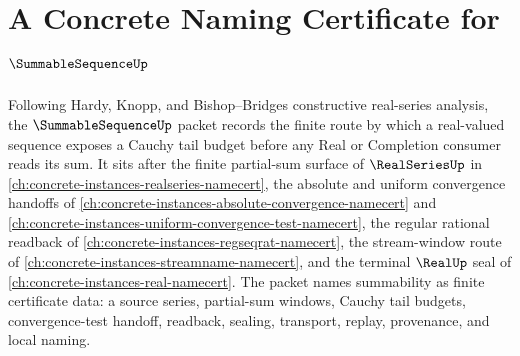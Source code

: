 \chapter{A Concrete Naming Certificate for $\SummableSequenceUp$}
\label{ch:concrete-instances-summable-sequence-namecert}

Following Hardy, Knopp, and Bishop--Bridges constructive real-series analysis, the $\SummableSequenceUp$ packet records the finite route by which a real-valued sequence exposes a Cauchy tail budget before any Real or Completion consumer reads its sum. It sits after the finite partial-sum surface of $\RealSeriesUp$ in \autoref{ch:concrete-instances-realseries-namecert}, the absolute and uniform convergence handoffs of \autoref{ch:concrete-instances-absolute-convergence-namecert} and \autoref{ch:concrete-instances-uniform-convergence-test-namecert}, the regular rational readback of \autoref{ch:concrete-instances-regseqrat-namecert}, the stream-window route of \autoref{ch:concrete-instances-streamname-namecert}, and the terminal $\RealUp$ seal of \autoref{ch:concrete-instances-real-namecert}. The packet names summability as finite certificate data: a source series, partial-sum windows, Cauchy tail budgets, convergence-test handoff, readback, sealing, transport, replay, provenance, and local naming.

